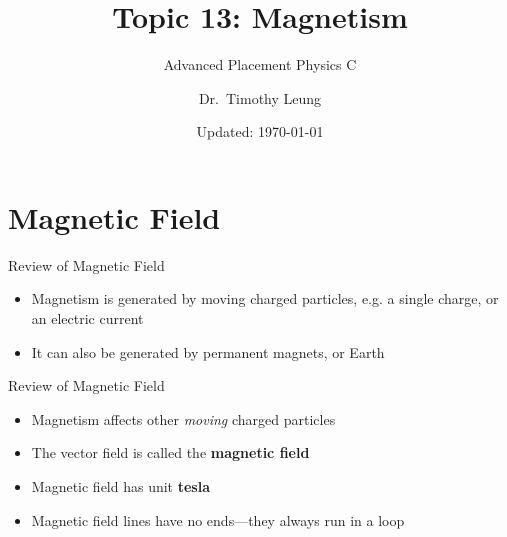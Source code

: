 \documentclass[12pt,aspectratio=169]{beamer}
\title{Topic 13: Magnetism}
\subtitle{Advanced Placement Physics C}
\author[TML]{Dr.\ Timothy Leung}
\institute{Olympiads School}
\date{Updated: \today}
\begin{document}
\begin{frame}
  \maketitle
\end{frame}



%



\section{Magnetic Field}

\begin{frame}{Review of Magnetic Field}
  \begin{itemize}
  \item Magnetism is generated by moving charged particles, e.g.
    a single charge, or an electric current
  \item It can also be generated by permanent magnets, or Earth
  \end{itemize}
\end{frame}



\begin{frame}{Review of Magnetic Field}
  \begin{itemize}
  \item Magnetism affects other \emph{moving} charged particles
  \item The vector field is called the \textbf{magnetic field}
  \item Magnetic field has unit \textbf{tesla}
  \item Magnetic field lines have no ends---they always run in a loop
  \end{itemize}
\end{frame}
\end{document}
